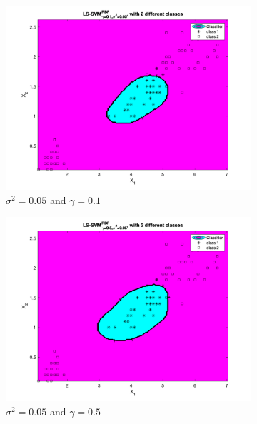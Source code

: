 \documentclass[a4paper, 11pt, one column]{article}
\begin{document}
\begin{figure}[]
		\begin{subfigure}{0.33\linewidth}
            \includegraphics[width=\linewidth]{images/ls_svm_rbf_g0.1_s0.05.png}
            \caption{$\sigma^2=0.05$ and $\gamma=0.1$}
        \end{subfigure}
        \begin{subfigure}{0.33\linewidth}
            \includegraphics[width=\linewidth]{images/ls_svm_rbf_g0.5_s0.05.png}
            \caption{$\sigma^2=0.05$ and $\gamma=0.5$}
        \end{subfigure}
        \begin{subfigure}{0.33\linewidth}

\end{subfigure}
\end{figure}
\end{document}
